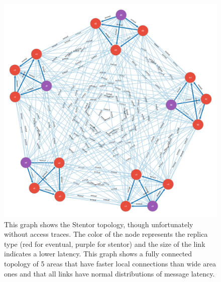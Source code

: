 \documentclass[11pt,letterpaper]{article}
\begin{document}
\begin{figure}[!h]
    \centering
        \includegraphics[width=\textwidth]{figures/stentor-topology.png}
        \caption{\textsf{This graph shows the Stentor topology, though unfortunately without access traces. The color of the node represents the replica type (red for eventual, purple for stentor) and the size of the link indicates a lower latency. This graph shows a fully connected topology of 5 areas that have faster local connections than wide area ones and that all links have normal distributions of message latency.}}
        \label{fig:topology}
\end{figure}
\end{document}
